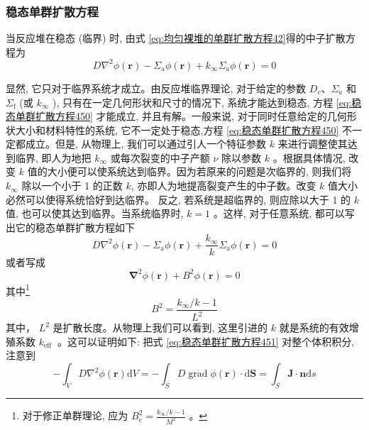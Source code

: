 \documentclass{Sichuan Normal University}
\begin{document}
\subsubsection*{稳态单群扩散方程}
当反应堆在稳态 (临界) 时, 由式 \eqref{eq:均匀裸堆的单群扩散方程42}得的中子扩散方程为
\begin{equation}
D \nabla^2 \phi(\boldsymbol{r})-\Sigma_{\mathrm{a}} \phi(\boldsymbol{r})+k_{\infty} \Sigma_{\mathrm{a}} \phi(\boldsymbol{r})=0
\label{eq:稳态单群扩散方程450}
\end{equation}

显然, 它只对于临界系统才成立。由反应堆临界理论, 对于给定的参数 $D_c 、 \Sigma_{a}$ 和 $\Sigma_{\mathrm{f}}$ (或 $k_{\infty}$ ), 只有在一定几何形状和尺寸的情况下, 系统才能达到稳态, 方程 \eqref{eq:稳态单群扩散方程450} 才能成立, 并且有解。一般来说, 对于同时任意给定的几何形状大小和材料特性的系统, 它不一定处于稳态,方程 \eqref{eq:稳态单群扩散方程450} 不一定都成立。但是, 从物理上, 我们可以通过引人一个特征参数 $k$ 来进行调整使其达到临界, 即人为地把 $k_{\infty}$ 或每次裂变的中子产额 $\nu$ 除以参数 $k$ 。根据具体情况, 改变 $k$ 值的大小便可以使系统达到临界。因为若原来的问题是次临界的, 则我们将 $k_{\infty}$ 除以一个小于 1 的正数 $k$, 亦即人为地提高裂变产生的中子数。改变 $k$ 值大小必然可以使得系统恰好到达临界。
反之, 若系统是超临界的, 则应除以大于 1 的 $k$ 值, 也可以使其达到临界。当系统临界时, $k=1$ 。这样, 对于任意系统, 都可以写出它的稳态单群扩散方程如下
\begin{equation}
D \nabla^2 \phi(\boldsymbol{r})-\Sigma_{\mathrm{a}} \phi(\boldsymbol{r})+\frac{k_{\infty}}{k} \Sigma_{\mathrm{a}} \phi(\boldsymbol{r})=0
\label{eq:稳态单群扩散方程451}
\end{equation}
或者写成
\begin{equation}
\boldsymbol{\nabla}^2 \phi(\boldsymbol{r})+B^2 \phi(\boldsymbol{r})=0
\end{equation}其中\footnote{对于修正单群理论, 应为 $B_{\mathrm{c}}^2=\frac{k_{\infty} / k-1}{M^2}$ 。}
\begin{equation}
B^2=\frac{k_{\infty} / k-1}{L^2}
\end{equation}
其中， $L^2$ 是扩散长度。从物理上我们可以看到, 这里引进的 $k$ 就是系统的有效增殖系数 $k_{\text {eff }}$ 。这可以证明如下: 把式 \eqref{eq:稳态单群扩散方程451} 对整个体积积分, 注意到
\begin{equation}
-\int_V D \nabla^2 \phi(\boldsymbol{r}) \mathrm{d} V=-\int_S D \operatorname{grad} \phi(\boldsymbol{r}) \cdot \mathrm{d} \boldsymbol{S}=\int_S \boldsymbol{J} \cdot \boldsymbol{n} \mathrm{d} s
\end{equation}
\end{document}
